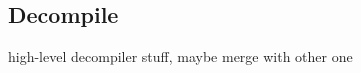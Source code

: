 





\subsection{Decompile}
\label{sec:meatdecompile}

high-level decompiler stuff, maybe merge with other one

